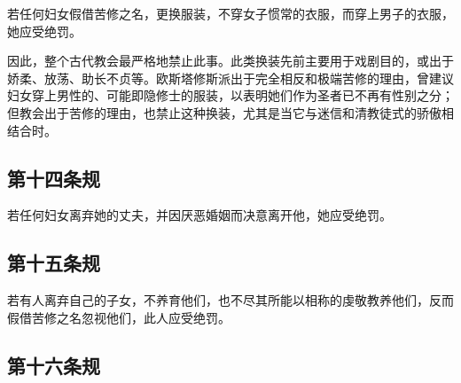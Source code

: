 若任何妇女假借苦修之名，更换服装，不穿女子惯常的衣服，而穿上男子的衣服，她应受绝罚。\par

 因此，整个古代教会最严格地禁止此事。此类换装先前主要用于戏剧目的，或出于娇柔、放荡、助长不贞等。欧斯塔修斯派出于完全相反和极端苦修的理由，曾建议妇女穿上男性的、可能即隐修士的服装，以表明她们作为圣者已不再有性别之分；但教会出于苦修的理由，也禁止这种换装，尤其是当它与迷信和清教徒式的骄傲相结合时。\par


\subsection{第十四条规}

若任何妇女离弃她的丈夫，并因厌恶婚姻而决意离开他，她应受绝罚。\par

\par


\subsection{第十五条规}

若有人离弃自己的子女，不养育他们，也不尽其所能以相称的虔敬教养他们，反而假借苦修之名忽视他们，此人应受绝罚。\par

\par


\subsection{第十六条规}

